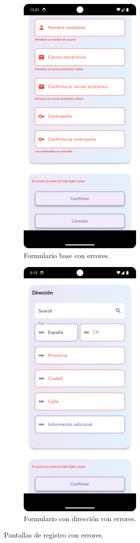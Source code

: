 \documentclass[a4paper, 12pt]{article}
\begin{document}
\begin{figure}[H]
   	\begin{subfigure}{0.48\textwidth}
		\begin{center}
			{\includegraphics[width=6cm]{app/RegisterUserError.png}\par}
			\caption{Formulario base con errores.}
		\end{center}  
	\end{subfigure}\hfill
   	\begin{subfigure}{0.48\textwidth}
		\begin{center}
			{\includegraphics[width=6cm]{app/AddressError.png}\par}
			\caption{Formulario con dirección con errores.}
		\end{center}  
	\end{subfigure}\hfill
	\caption{Pantallas de registro con errores.}
\end{figure}
\end{document}
